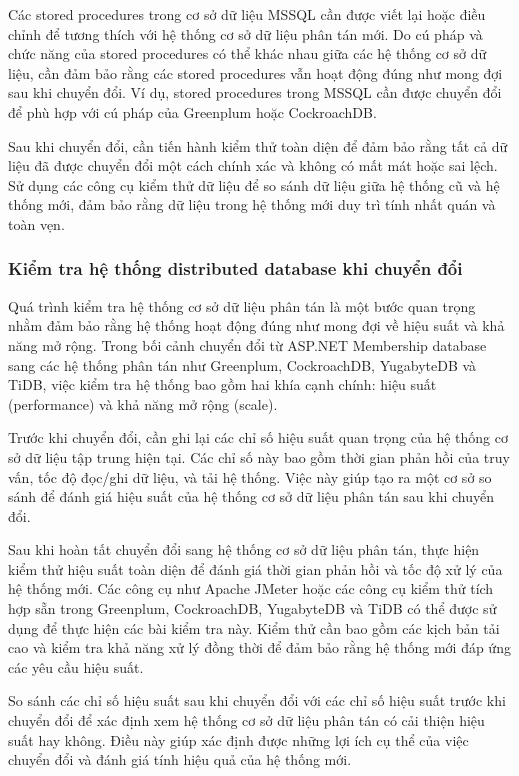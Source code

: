\documentclass{article}[14pt]
\begin{document}
Các stored procedures trong cơ sở dữ liệu MSSQL cần được viết lại hoặc điều chỉnh để tương thích với hệ thống cơ sở dữ liệu phân tán mới. Do cú pháp và chức năng của stored procedures có thể khác nhau giữa các hệ thống cơ sở dữ liệu, cần đảm bảo rằng các stored procedures vẫn hoạt động đúng như mong đợi sau khi chuyển đổi. Ví dụ, stored procedures trong MSSQL cần được chuyển đổi để phù hợp với cú pháp của Greenplum hoặc CockroachDB.

Sau khi chuyển đổi, cần tiến hành kiểm thử toàn diện để đảm bảo rằng tất cả dữ liệu đã được chuyển đổi một cách chính xác và không có mất mát hoặc sai lệch. Sử dụng các công cụ kiểm thử dữ liệu để so sánh dữ liệu giữa hệ thống cũ và hệ thống mới, đảm bảo rằng dữ liệu trong hệ thống mới duy trì tính nhất quán và toàn vẹn.

\subsubsection{Kiểm tra hệ thống distributed database khi chuyển đổi}

Quá trình kiểm tra hệ thống cơ sở dữ liệu phân tán là một bước quan trọng nhằm đảm bảo rằng hệ thống hoạt động đúng như mong đợi về hiệu suất và khả năng mở rộng. Trong bối cảnh chuyển đổi từ ASP.NET Membership database sang các hệ thống phân tán như Greenplum, CockroachDB, YugabyteDB và TiDB, việc kiểm tra hệ thống bao gồm hai khía cạnh chính: hiệu suất (performance) và khả năng mở rộng (scale).

Trước khi chuyển đổi, cần ghi lại các chỉ số hiệu suất quan trọng của hệ thống cơ sở dữ liệu tập trung hiện tại. Các chỉ số này bao gồm thời gian phản hồi của truy vấn, tốc độ đọc/ghi dữ liệu, và tải hệ thống. Việc này giúp tạo ra một cơ sở so sánh để đánh giá hiệu suất của hệ thống cơ sở dữ liệu phân tán sau khi chuyển đổi.

Sau khi hoàn tất chuyển đổi sang hệ thống cơ sở dữ liệu phân tán, thực hiện kiểm thử hiệu suất toàn diện để đánh giá thời gian phản hồi và tốc độ xử lý của hệ thống mới. Các công cụ như Apache JMeter hoặc các công cụ kiểm thử tích hợp sẵn trong Greenplum, CockroachDB, YugabyteDB và TiDB có thể được sử dụng để thực hiện các bài kiểm tra này. Kiểm thử cần bao gồm các kịch bản tải cao và kiểm tra khả năng xử lý đồng thời để đảm bảo rằng hệ thống mới đáp ứng các yêu cầu hiệu suất.

So sánh các chỉ số hiệu suất sau khi chuyển đổi với các chỉ số hiệu suất trước khi chuyển đổi để xác định xem hệ thống cơ sở dữ liệu phân tán có cải thiện hiệu suất hay không. Điều này giúp xác định được những lợi ích cụ thể của việc chuyển đổi và đánh giá tính hiệu quả của hệ thống mới.
\end{document}
